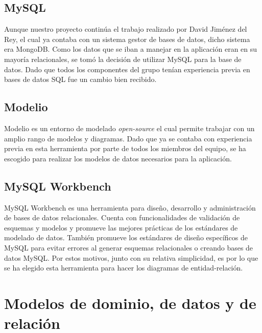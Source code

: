 \documentclass[11pt]{book}
\begin{document}
	\section{MySQL}
	Aunque nuestro proyecto continúa el trabajo realizado por David Jiménez del Rey, el cual ya contaba con un sistema gestor de bases de datos, dicho sistema era MongoDB. Como los datos que se iban a manejar en la aplicación eran en su mayoría relacionales, se tomó la decisión de utilizar MySQL para la base de datos. Dado que todos los componentes del grupo tenían experiencia previa en bases de datos SQL fue un cambio bien recibido.
	
	\section{Modelio}	
	Modelio es un entorno de modelado \emph{open-source} el cual permite trabajar con un amplio rango de modelos y diagramas. Dado que ya se contaba con experiencia previa en esta herramienta por parte de todos los miembros del equipo, se ha escogido para realizar los modelos de datos necesarios para la aplicación.
	
	\section{MySQL Workbench}
	MySQL Workbench es una herramienta para diseño, desarrollo y administración de bases de datos relacionales. 
	Cuenta con funcionalidades de validación de esquemas y modelos y promueve las mejores prácticas de los estándares de modelado de datos. También promueve los estándares de diseño específicos de MySQL para evitar errores al generar esquemas relacionales o creando bases de datos MySQL. Por estos motivos, junto con su relativa simplicidad, es por lo que se ha elegido esta herramienta para hacer los diagramas de entidad-relación.

	
	\chapter{Modelos de dominio, de datos y de relación}\label{cap:modelos}
	
\end{document}

